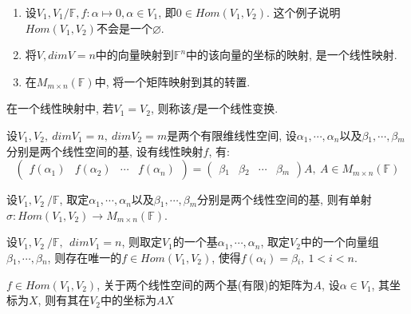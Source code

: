 \begin{example}
    \par
    \begin{enumerate}[itemindent=1em]
        \item 设$V_1, V_1/\mathbb{F}, f: \alpha \mapsto 0, \alpha \in V_1$, 即$0 \in Hom(V_1, V_2)$. 这个例子说明$Hom(V_1, V_2)$不会是一个$\varnothing$.
        \item 将$V, dimV=n$中的向量映射到$\mathbb{F}^n$中的该向量的坐标的映射, 是一个线性映射.
        \item 在$M_{m\times n}(\mathbb{F})$中, 将一个矩阵映射到其的转置.
    \end{enumerate}
\end{example}

\begin{definition}[线性变换]
    在一个线性映射中, 若$V_1 = V_2$, 则称该$f$是一个线性变换.
\end{definition}

\begin{definition}[线性映射的矩阵]
    设$V_1, V_2, \ dimV_1=n, \ dimV_2=m$是两个有限维线性空间, 设$\alpha{_1}, \cdots, \alpha{_n}$以及$\beta{_1}, \cdots, \beta{_m}$分别是两个线性空间的基, 设有线性映射$f$, 有:
    \[\begin{pmatrix}
        f(\alpha{_1}) & f(\alpha{_2}) & \cdots & f(\alpha{_n})
    \end{pmatrix}=\begin{pmatrix}
        \beta{_1} & \beta{_2} & \cdots & \beta{_m}
    \end{pmatrix}A, \ A \in M_{m\times n}(\mathbb{F})\]
\end{definition}

\begin{example}
    设$V_1, V_2\ / \mathbb{F}$, 取定$\alpha{_1}, \cdots, \alpha{_n}$以及$\beta{_1}, \cdots, \beta{_m}$分别是两个线性空间的基, 则有单射$\sigma: Hom(V_1, V_2) \to M_{m\times n}(\mathbb{F})$.
\end{example}

\begin{theorem}[线性映射存在性与唯一性定理]
    设$V_1, V_2\ / \mathbb{F}, \ \ dimV_1 = n$, 则取定$V_1$的一个基$\alpha{_1}, \cdots, \alpha{_n}$, 取定$V_2$中的一个向量组$\beta{_1}, \cdots, \beta{_n}$, 则存在唯一的$f \in Hom(V_1, V_2)$, 使得$f(\alpha{_i})=\beta{_i},\ 1 < i < n$.
\end{theorem}

\begin{example}
    $f \in Hom(V_1, V_2)$, 关于两个线性空间的两个基(有限)的矩阵为$A$, 设$\alpha \in V_1$, 其坐标为$X$, 则有其在$V_2$中的坐标为$AX$
\end{example}

